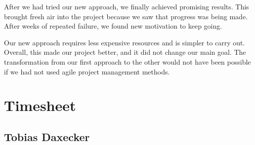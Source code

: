 After we had tried our new approach, we finally achieved promising results.
This brought fresh air into the project because we saw that progress was being made.
After weeks of repeated failure, we found new motivation to keep going.

Our new approach requires less expensive resources and is simpler to carry out.
Overall, this made our project better, and it did not change our main goal.
The transformation from our first approach to the other would not have been possible if we had not used agile project management methods.



\newpage


\section{Timesheet}

\subsection{Tobias Daxecker}

